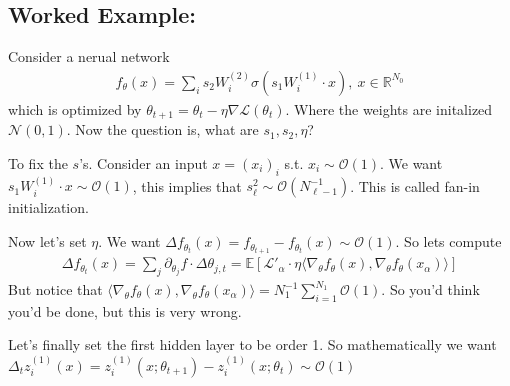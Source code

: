 \subsection{Worked Example:}
Consider a nerual network
\begin{align}
	f_\theta(x) = \sum_i s_2 W_i^{(2)} \sigma(s_1 W_i^{(1)} \cdot x) , ~ x \in \mathbb R^{N_0}
\end{align}
which is optimized by $\theta_{t+1} = \theta_t - \eta \nabla \mathcal L (\theta_t)$. Where the weights are initalized $\mathcal N(0,1)$. Now the question is, what are $s_1,s_2,\eta$?

To fix the $s$'s. Consider an input $x = (x_i)_{i}$ s.t. $x_i \sim \mathcal O(1)$. We want $s_1 W_i^{(1)} \cdot x \sim \mathcal O(1)$, this implies that $s_\ell^2 \sim \mathcal O(N^{-1}_{\ell-1})$. This is called fan-in initialization. 

Now let's set $\eta$. We want $\Delta f_{\theta_t}(x) = f_{\theta_{t+1}} - f_{\theta_t}(x) \sim \mathcal O(1)$. So lets compute
\begin{align}
	\Delta f_{\theta_t}(x) = \sum_j \partial_{\theta_j} f \cdot \Delta \theta_{j,t} = \mathbb E [ \mathcal L'_\alpha \cdot \eta \langle \nabla_\theta f_\theta(x), \nabla_\theta f_\theta(x_\alpha)\rangle]
\end{align}
But notice that $\langle \nabla_\theta f_\theta(x), \nabla_\theta f_\theta(x_\alpha)\rangle = N_1^{-1} \sum_{i=1}^{N_1} \mathcal O(1)$. So you'd think you'd be done, but this is very wrong.

Let's finally set the first hidden layer to be order 1. So mathematically we want $\Delta_t z_i^{(1)}(x) = z_i^{(1)} (x; \theta_{t+1}) - z_i^{(1)}(x; \theta_t) \sim \mathcal O(1)$




















